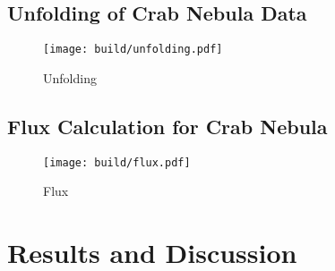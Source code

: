         \subsection{Unfolding of Crab Nebula Data}
            \begin{figure}
                \centering
                \texttt{[image: build/unfolding.pdf]}
                \caption{
                    Unfolding
                }
                \label{fig:unfolding}
            \end{figure}

        \subsection{Flux Calculation for Crab Nebula}
            \begin{figure}
                \centering
                \texttt{[image: build/flux.pdf]}
                \caption{
                    Flux
                }
                \label{fig:flux}
            \end{figure}


%
%
    \section{Results and Discussion}

\newpage
\printbibliography
\newpage

